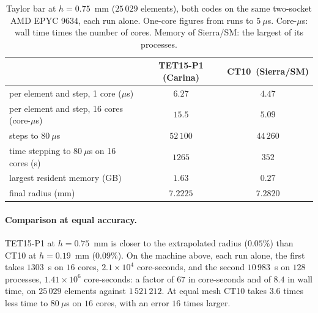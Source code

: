 \documentclass{article}
\theoremstyle{definition}
\theoremstyle{plain}
\begin{document}
\begin{table}[tbp]
\centering
\caption{Taylor bar at $h = 0.75$~mm ($25\,029$ elements), both codes on
the same two-socket AMD EPYC 9634, each run alone. One-core figures from
runs to $5~\mu$s. Core-$\mu$s: wall time times the number of cores.
Memory of Sierra/SM: the largest of its processes.}
\label{tab:taylorcost}
\small
\begin{tabular}{lcc}
\toprule
 & TET15-P1 (Carina) & CT10\ (Sierra/SM) \\
\midrule
per element and step, 1 core ($\mu$s)          & $6.27$ & $4.47$ \\
per element and step, 16 cores (core-$\mu$s)   & $15.5$ & $5.09$ \\
steps to $80~\mu$s                              & $52\,100$ & $44\,260$ \\
time stepping to $80~\mu$s on 16 cores (s)     & $1265$ & $352$ \\
largest resident memory (GB)                    & $1.63$ & $0.27$ \\
final radius (mm)                               & $7.2225$ & $7.2820$ \\
\bottomrule
\end{tabular}
\end{table}

\paragraph{Comparison at equal accuracy.} TET15-P1 at $h = 0.75$~mm is
closer to the extrapolated radius ($0.05\%$) than CT10 at $h = 0.19$~mm ($0.09\%$). On the machine above, each run
alone, the first takes $1303$~s on $16$ cores, $2.1 \times 10^{4}$
core-seconds, and the second $10\,983$~s on $128$ processes,
$1.41 \times 10^{6}$ core-seconds: a factor of $67$ in core-seconds and of
$8.4$ in wall time, on $25\,029$ elements against $1\,521\,212$. At equal
mesh CT10 takes $3.6$ times less time to $80~\mu$s on
$16$ cores, with an error $16$ times larger.
\end{document}
